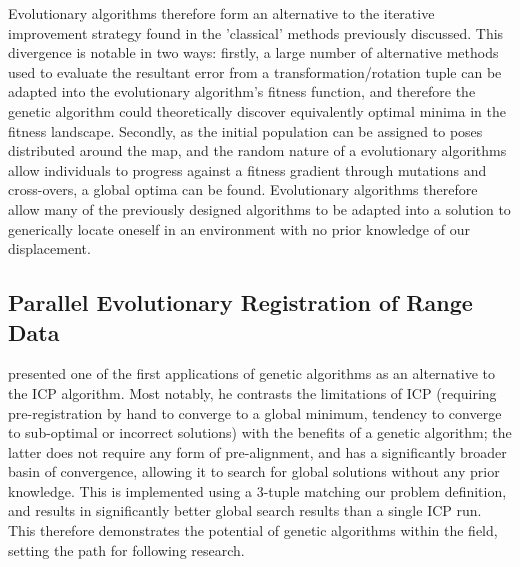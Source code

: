 \documentclass[authoryearcitations]{UoYCSproject}
\begin{document}
Evolutionary algorithms therefore form an alternative to the iterative improvement strategy found in the 'classical' methods previously discussed. This divergence is notable in two ways: firstly, a large number of alternative methods used to evaluate the resultant error from a transformation/rotation tuple can be adapted into the evolutionary algorithm's fitness function, and therefore the genetic algorithm could theoretically discover equivalently optimal minima in the fitness landscape. Secondly, as the initial population can be assigned to poses distributed around the map, and the random nature of a evolutionary algorithms allow individuals to progress against a fitness gradient through mutations and cross-overs, a global optima can be found. Evolutionary algorithms therefore allow many of the previously designed algorithms to be adapted into a solution to generically locate oneself in an environment with no prior knowledge of our displacement.


\subsection{Parallel Evolutionary Registration of Range Data}
\citet{Robertson2002-ou} presented one of the first applications of genetic algorithms as an alternative to the ICP algorithm. Most notably, he contrasts the limitations of ICP (requiring pre-registration by hand to converge to a global minimum, tendency to converge to sub-optimal or incorrect solutions) with the benefits of a genetic algorithm; the latter does not require any form of pre-alignment, and has a significantly broader basin of convergence, allowing it to search for global solutions without any prior knowledge. This is implemented using a 3-tuple matching our problem definition, and results in significantly better global search results than a single ICP run. This therefore demonstrates the potential of genetic algorithms within the field, setting the path for following research.
\end{document}
